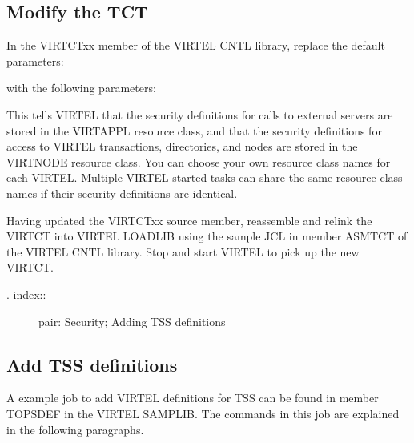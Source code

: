 \documentclass[letterpaper,10pt,english]{sphinxmanual}
\begin{document}
\subsection{Modify the TCT}
\label{\detokenize{Installation_Guide:modify-the-tct}}
In the VIRTCTxx member of the VIRTEL CNTL library, replace the default parameters:

\begin{sphinxVerbatim}[commandchars=\\\{\}]
\end{sphinxVerbatim}

with the following parameters:

\begin{sphinxVerbatim}[commandchars=\\\{\}]
\end{sphinxVerbatim}

This tells VIRTEL that the security definitions for calls to external servers are stored in the VIRTAPPL resource class, and that the security definitions for access to VIRTEL transactions, directories, and nodes are stored in the VIRTNODE resource class. You can choose your own resource class names for each VIRTEL.  Multiple VIRTEL started tasks can share the same resource class names if their security definitions are identical.

Having updated the VIRTCTxx source member, reassemble and relink the VIRTCT into VIRTEL LOADLIB using the sample JCL in member ASMTCT of the VIRTEL CNTL library. Stop and start VIRTEL to pick up the new VIRTCT.
\begin{description}
\item[{. index::}] \leavevmode
pair: Security; Adding TSS definitions

\end{description}


\subsection{Add TSS definitions}
\label{\detokenize{Installation_Guide:add-tss-definitions}}
A example job to add VIRTEL definitions for TSS can be found in member TOPSDEF in the VIRTEL SAMPLIB. The commands in this job are explained in the following paragraphs.
\end{document}
